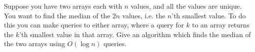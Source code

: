 \problem{}
Suppose you have two arrays each with $n$ values, and all the values are unique.  You want to find the median of the $2n$ values, i.e. the $n$'th smallest value.  To do this you can make queries to either array, where a query for $k$ to an array returns the $k$'th smallest value in that array.  Give an algorithm which finds the median of the two arrays using $O(\log n)$ queries.  













\newpage
